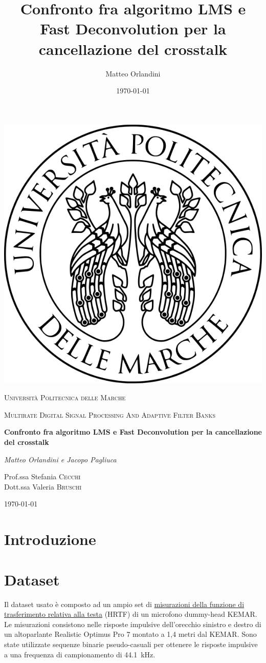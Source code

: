 \documentclass[12pt,a4paper,titlepage]{article}
\title{Confronto fra algoritmo LMS e Fast Deconvolution per la cancellazione del crosstalk}
\author{Matteo Orlandini}
\date{\today}
\begin{document}
\begin{titlepage}
	
	\centering
	\includegraphics[width=.2\textwidth]{Immagini/univpmlogo}\par\vspace{1cm}
	{\scshape\LARGE Università Politecnica delle Marche\par}
	\vspace{1cm}
	{\scshape\Large Multirate Digital Signal Processing And Adaptive Filter Banks \par}
	\vspace{1.5cm}
	{\huge\bfseries Confronto fra algoritmo LMS e Fast Deconvolution per la cancellazione del crosstalk \par}
	\vspace{2cm}
	{\Large\itshape Matteo Orlandini e Jacopo Pagliuca\par}
	\vfill
	Prof.ssa Stefania \textsc{Cecchi}\\
	Dott.ssa Valeria \textsc{Bruschi}
	
	\vfill
	
	{\large \today\par}
\end{titlepage}

\thispagestyle{empty}
\tableofcontents

\newpage
\setcounter{page}{1}
\section{Introduzione}
\label{section:Introduzione}

\section{Dataset}
\label{section:Dataset}
Il dataset usato è composto ad un ampio set di \href{http://sound.media.mit.edu/resources/KEMAR/full.zip}{misurazioni della funzione di trasferimento relativa alla testa} (HRTF) di un microfono dummy-head KEMAR. Le misurazioni consistono nelle risposte impulsive dell'orecchio sinistro e destro di un altoparlante Realistic Optimus Pro 7 montato a 1,4 metri dal KEMAR. Sono state utilizzate sequenze binarie pseudo-casuali per ottenere le risposte impulsive a una frequenza di campionamento di \SI{44.1}{\kilo \hertz}. \cite{Gardner:HRTF}
\end{document}
